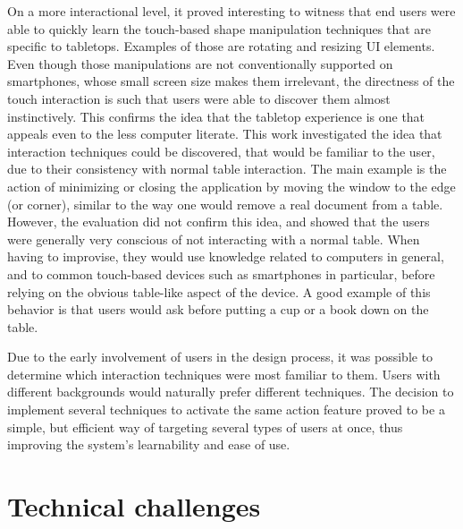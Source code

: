 On a more interactional level, it proved interesting to witness that end users were able to quickly learn the touch-based shape manipulation techniques that are specific to tabletops.
Examples of those are rotating and resizing UI elements.
Even though those manipulations are not conventionally supported on smartphones, whose small screen size makes them irrelevant, the directness of the touch interaction is such that users were able to discover them almost instinctively.
This confirms the idea that the tabletop experience is one that appeals even to the less computer literate.
This work investigated the idea that interaction techniques could be discovered, that would be familiar to the user, due to their consistency with normal table interaction.
The main example is the action of minimizing or closing the application by moving the window to the edge (or corner), similar to the way one would remove a real document from a table.
However, the evaluation did not confirm this idea, and showed that the users were generally very conscious of not interacting with a normal table.
When having to improvise, they would use knowledge related to computers in general, and to common touch-based devices such as smartphones in particular, before relying on the obvious table-like aspect of the device.
A good example of this behavior is that users would ask before putting a cup or a book down on the table.



Due to the early involvement of users in the design process, it was possible to determine which interaction techniques were most familiar to them.
Users with different backgrounds would naturally prefer different techniques.
The decision to implement several techniques to activate the same action feature proved to be a simple, but efficient way of targeting several types of users at once, thus improving the system's learnability and ease of use.

\section{Technical challenges}
\label{disc:technical}

